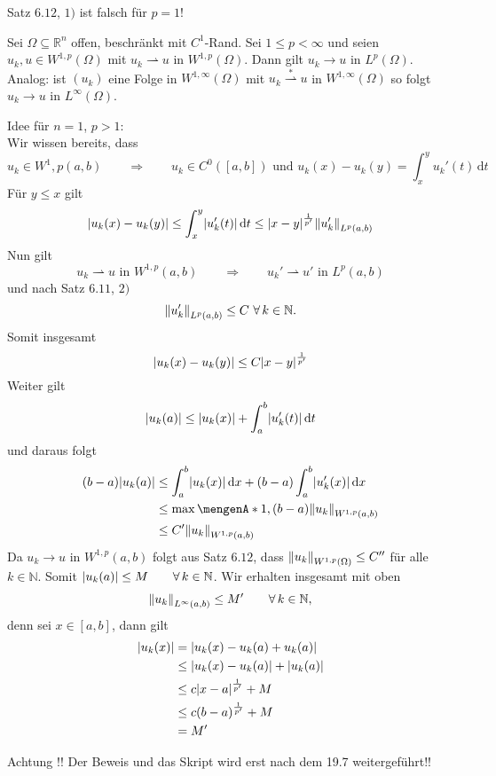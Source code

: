 \begin{bemerkung}
	Satz $6.12$, $1)$ ist falsch für $p=1$!
\end{bemerkung}
\begin{satz}[Rellich]
	Sei $\Omega \subseteq \mathbb{R}^n$ offen, beschränkt mit $C^1$-Rand. Sei $1 \leq p < \infty$ und seien $u_k,u \in W^{1,p}(\Omega)$ mit $u_k \rightharpoonup u$ in $W^{1,p}(\Omega)$. Dann gilt $u_k \to u$ in $L^p(\Omega)$. \\
	Analog: ist $(u_k)$ eine Folge in $W^{1,\infty}(\Omega)$ mit $u_k \stackrel{*}{\rightharpoonup}u $ in $W^{1,\infty}(\Omega)$ so folgt $u_k \to u$ in $L^{\infty}(\Omega)$.
\end{satz}
\begin{beweis}
	Idee für $n=1$, $p>1$: \\
	Wir wissen bereits, dass
	\[
		u_k \in W^1,p(a,b) \qquad \Rightarrow \qquad u_k \in C^0([a,b]) \text{ und } u_k(x)-u_k(y) = \int_{x}^{y} u_k'(t) \,\mathrm{d}t
	\]
	Für $y \leq x$ gilt
	\[
		\abs{u_k(x)-u_k(y)} \leq \int_{x}^{y}\abs{u_k'(t)} \,\mathrm{d}t \leq \abs{x-y}^{\frac{1}{p'}}\norm{u'_k}_{L^p(a,b)}
	\]
	Nun gilt
	\[
		u_k \rightharpoonup u \text{ in } W^{1,p}(a,b) \qquad \Rightarrow \qquad u_k' \rightharpoonup u' \text{ in }L^p(a,b) 
	\]
	und nach Satz $6.11$, $2)$
	\[
	 \norm{u'_k}_{L^p(a,b)} \leq C \,\,\forall\,  k \in \mathbb{N}.
	\]
	Somit insgesamt
	\[
		\lvert u_k(x)-u_k(y)\rvert \leq C \lvert x-y\rvert^{\frac{1}{p'}}	
	\]
	Weiter gilt
	\[
		\lvert u_k(a)\rvert \leq \lvert u_k(x)\rvert + \int_{a}^{b}\lvert u'_k(t)\rvert \,\mathrm{d}t
	\]
	und daraus folgt
	\begin{align*}
		(b-a)\abs{u_k(a)} &\leq \int_{a}^{b} \abs{u_k(x)} \,\mathrm{d}x + (b-a) \int_{a}^{b} \abs{u_k'(x)} \,\mathrm{d}x \\
		&\leq \max \set{1,(b-a)} \norm{u_k}_{W^{1,p}(a,b)} \\
		&\leq C' \norm{u_k}_{W^{1,p}(a,b)} 
	\end{align*}
	Da $u_k \to u$ in $W^{1,p}(a,b)$ folgt aus Satz $6.12$, dass $\norm{u_k}_{W^{1,p}(\Omega)} \leq C''$ für alle $k \in \mathbb{N}$. Somit
	$\lvert u_k(a)\rvert \leq M \qquad \forall\, k \in \mathbb{N}$. Wir erhalten insgesamt mit oben
	\[
		\norm{u_k}_{L^\infty(a,b)} \leq M' \qquad \forall\, k \in \mathbb{N},
	\]
	denn sei $x \in [a,b]$, dann gilt
	\begin{align*}
		\lvert u_k(x)\rvert &= \lvert u_k(x)-u_k(a) + u_k(a)\rvert \\
		&\leq \lvert u_k(x)- u_k(a)\rvert+ \lvert u_k(a)\rvert \\
		&\leq c \lvert x-a\rvert^{\frac{1}{p'}} + M \\
		&\leq c (b-a)^{\frac{1}{p'}}+ M \\
		&= M'
	\end{align*}
	
\begin{centering}
	\begin{Large}
		Achtung !! Der Beweis und das Skript wird erst nach dem 19.7 weitergeführt!! 
	\end{Large}
\end{centering}
	
\end{beweis}
\cleardoubleoddemptypage
{}
\setcounter{page}{1}

